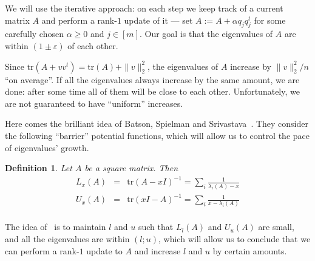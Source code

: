 \documentclass[12pt]{article}
\newcommand{\eps}{\varepsilon}
\newtheorem{definition}{Definition}
\begin{document}
    We will use the iterative approach: on each step we keep track of a current matrix $A$
    and perform a rank-$1$ update of it --- set $A := A + \alpha q_j q_j^t$ for some carefully chosen $\alpha \geq 0$ and
    $j \in [m]$. Our goal is that the eigenvalues of $A$ are within $(1 \pm \eps)$ of each other.

    Since $\mathrm{tr}(A + vv^t) = \mathrm{tr}(A) + \|v\|_2^2$, the eigenvalues of $A$ increase by
    $\|v\|_2^2 / n$ ``on average''. If all the eigenvalues always increase by the same amount, we are done: after some time
    all of them will be close to each other.
    Unfortunately, we are not guaranteed to have ``uniform'' increases.

    Here comes the brilliant idea of Batson, Spielman and Srivastava~\cite{BSS09}.
    They consider the following ``barrier'' potential functions, which will allow us to control the pace of eigenvalues'
    growth.

    \begin{definition}
        Let $A$ be a square matrix. Then
        \begin{eqnarray*}
            L_x(A) &=& \mathrm{tr}(A - xI)^{-1} = \sum_i \frac{1}{\lambda_i(A) - x}\\
            U_x(A) &=& \mathrm{tr}(xI - A)^{-1} = \sum_i \frac{1}{x - \lambda_i(A)}\\
        \end{eqnarray*}
    \end{definition}

    The idea of~\cite{BSS09} is to maintain $l$ and $u$ such that $L_l(A)$ and $U_u(A)$ are small, and all the eigenvalues are
    within $(l; u)$, which will allow us
    to conclude that we can perform a rank-$1$ update to $A$ and increase $l$ and $u$ by certain amounts.
\end{document}
